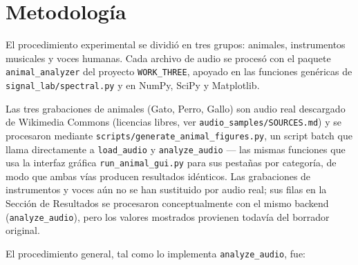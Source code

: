 
\section{Metodología}

El procedimiento experimental se dividió en tres grupos: animales, instrumentos musicales y voces humanas. Cada archivo de audio se procesó con el paquete \texttt{animal\_analyzer} del proyecto \texttt{WORK\_THREE}, apoyado en las funciones genéricas de \texttt{signal\_lab/spectral.py} y en NumPy, SciPy \cite{scipy} y Matplotlib.

Las tres grabaciones de animales (Gato, Perro, Gallo) son audio real descargado de Wikimedia Commons (licencias libres, ver \texttt{audio\_samples/SOURCES.md}) y se procesaron mediante \texttt{scripts/generate\_animal\_figures.py}, un script batch que llama directamente a \texttt{load\_audio} y \texttt{analyze\_audio} — las mismas funciones que usa la interfaz gráfica \texttt{run\_animal\_gui.py} para sus pestañas por categoría, de modo que ambas vías producen resultados idénticos. Las grabaciones de instrumentos y voces aún no se han sustituido por audio real; sus filas en la Sección de Resultados se procesaron conceptualmente con el mismo backend (\texttt{analyze\_audio}), pero los valores mostrados provienen todavía del borrador original.

El procedimiento general, tal como lo implementa \texttt{analyze\_audio}, fue:

